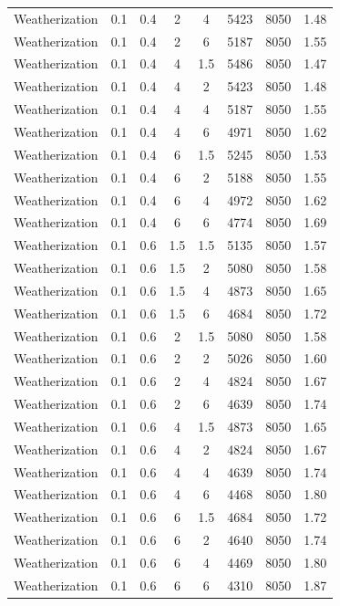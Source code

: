 \begin{table}
\begin{tabular}{cccccccc}
		Weatherization & 0.1 & 0.4 & 2 & 4 & 5423 & 8050 & 1.48 \\
		Weatherization & 0.1 & 0.4 & 2 & 6 & 5187 & 8050 & 1.55 \\
		Weatherization & 0.1 & 0.4 & 4 & 1.5 & 5486 & 8050 & 1.47 \\
		Weatherization & 0.1 & 0.4 & 4 & 2 & 5423 & 8050 & 1.48 \\
		Weatherization & 0.1 & 0.4 & 4 & 4 & 5187 & 8050 & 1.55 \\
		Weatherization & 0.1 & 0.4 & 4 & 6 & 4971 & 8050 & 1.62 \\
		Weatherization & 0.1 & 0.4 & 6 & 1.5 & 5245 & 8050 & 1.53 \\
		Weatherization & 0.1 & 0.4 & 6 & 2 & 5188 & 8050 & 1.55 \\
		Weatherization & 0.1 & 0.4 & 6 & 4 & 4972 & 8050 & 1.62 \\
		Weatherization & 0.1 & 0.4 & 6 & 6 & 4774 & 8050 & 1.69 \\
		Weatherization & 0.1 & 0.6 & 1.5 & 1.5 & 5135 & 8050 & 1.57 \\
		Weatherization & 0.1 & 0.6 & 1.5 & 2 & 5080 & 8050 & 1.58 \\
		Weatherization & 0.1 & 0.6 & 1.5 & 4 & 4873 & 8050 & 1.65 \\
		Weatherization & 0.1 & 0.6 & 1.5 & 6 & 4684 & 8050 & 1.72 \\
		Weatherization & 0.1 & 0.6 & 2 & 1.5 & 5080 & 8050 & 1.58 \\
		Weatherization & 0.1 & 0.6 & 2 & 2 & 5026 & 8050 & 1.60 \\
		Weatherization & 0.1 & 0.6 & 2 & 4 & 4824 & 8050 & 1.67 \\
		Weatherization & 0.1 & 0.6 & 2 & 6 & 4639 & 8050 & 1.74 \\
		Weatherization & 0.1 & 0.6 & 4 & 1.5 & 4873 & 8050 & 1.65 \\
		Weatherization & 0.1 & 0.6 & 4 & 2 & 4824 & 8050 & 1.67 \\
		Weatherization & 0.1 & 0.6 & 4 & 4 & 4639 & 8050 & 1.74 \\
		Weatherization & 0.1 & 0.6 & 4 & 6 & 4468 & 8050 & 1.80 \\
		Weatherization & 0.1 & 0.6 & 6 & 1.5 & 4684 & 8050 & 1.72 \\
		Weatherization & 0.1 & 0.6 & 6 & 2 & 4640 & 8050 & 1.74 \\
		Weatherization & 0.1 & 0.6 & 6 & 4 & 4469 & 8050 & 1.80 \\
		Weatherization & 0.1 & 0.6 & 6 & 6 & 4310 & 8050 & 1.87 \\
		\bottomrule
	\end{tabular}
\end{table}

